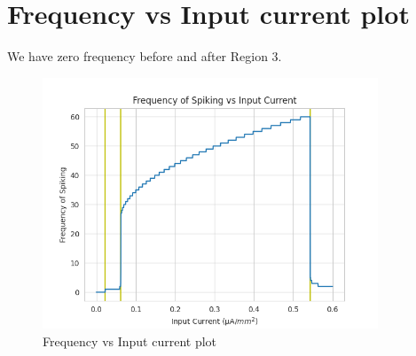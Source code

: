 \documentclass{article}
\begin{document}
\newpage
\section{Frequency vs Input current plot}
We have zero frequency before and after Region 3.

 \begin{figure}[h]
 \centering
\includegraphics[width=10cm]{freq.png}
\caption{Frequency vs Input current plot}

\end{figure}






\end{document}
